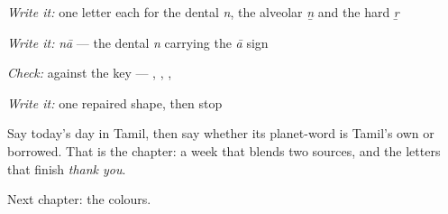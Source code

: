 \emph{Write it:} one letter each for the dental \emph{n}, the alveolar \emph{ṉ} and the hard \emph{ṟ}

\emph{Write it:} \emph{nā} — the dental \emph{n} carrying the \emph{ā} sign

\emph{Check:} against the key — \textbf{}, \textbf{}, \textbf{}, \textbf{}

\emph{Write it:} one repaired shape, then stop

\begin{tcolorbox}[breakable,colback=teal!4,colframe=teal!35!black,title={Before you move on}]
Say today's day in Tamil, then say whether its planet-word is Tamil's own or borrowed. That is the chapter: a week that blends two sources, and the letters that finish \emph{thank you}.

Next chapter: the colours.
\end{tcolorbox}
